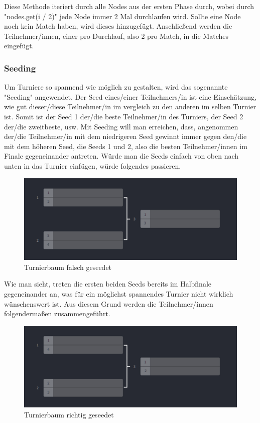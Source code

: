 Diese Methode iteriert durch alle Nodes aus der ersten Phase durch, wobei durch "nodes.get(i / 2)" jede Node immer 2 Mal durchlaufen wird. 
Sollte eine Node noch kein Match haben, wird dieses hinzugefügt. Anschließend werden die Teilnehmer/innen, einer pro Durchlauf, also 2 pro Match, 
in die Matches eingefügt. 

\subsubsection{Seeding}

Um Turniere so spannend wie möglich zu gestalten, wird das sogenannte "Seeding" angewendet. Der Seed eines/einer Teilnehmers/in ist eine Einschätzung, wie gut dieser/diese Teilnehmer/in im vergleich zu den anderen im selben Turnier
ist. Somit ist der Seed 1 der/die beste Teilnehmer/in des Turniers, der Seed 2 der/die zweitbeste, usw. Mit Seeding will man erreichen, dass, angenommen der/die Teilnehmer/in mit dem niedrigeren Seed gewinnt immer gegen den/die 
mit dem höheren Seed, die Seeds 1 und 2, also die besten Teilnehmer/innen im Finale gegeneinander antreten. Würde man die Seeds einfach von oben nach unten in das Turnier einfügen, würde folgendes passieren.


\begin{figure}[H]
    \includegraphics[scale=0.33]{pics/backend/elimination/elimination_tree_seeded_wrong.png}
    \caption{Turnierbaum falsch geseedet\cite{implementation-execution-1}}
\end{figure}

Wie man sieht, treten die ersten beiden Seeds bereits im Halbfinale gegeneinander an, was für ein möglichst spannendes Turnier nicht wirklich wünschenswert ist. Aus diesem Grund werden die Teilnehmer/innen folgendermaßen zusammengeführt.

\begin{figure}[H]
    \includegraphics[scale=0.515]{pics/backend/elimination/elimination_tree_seeded.png}
    \caption{Turnierbaum richtig geseedet\cite{implementation-execution-1}}
\end{figure}

